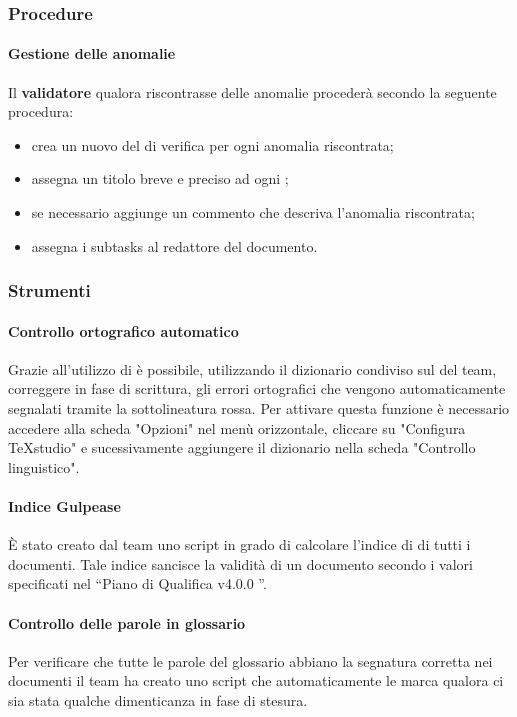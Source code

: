 \subsubsection{Procedure}
\label{sec:3.2.2}
	\paragraph{Gestione delle anomalie}
	\label{sec:3.2.2.1}
			Il \textbf{validatore} qualora riscontrasse delle anomalie procederà secondo la seguente procedura:
			\begin{itemize}
				\item crea un nuovo  del  di verifica per ogni anomalia riscontrata;
				\item assegna un titolo breve e preciso ad ogni ;
				\item se necessario aggiunge un commento che descriva l'anomalia riscontrata;
				\item assegna i subtasks al redattore del documento.
			\end{itemize}
\subsubsection{Strumenti}
\label{sec:3.2.3}
\paragraph{Controllo ortografico automatico}
Grazie all'utilizzo di  è possibile, utilizzando il dizionario condiviso sul  del team, correggere in fase di scrittura, gli errori ortografici che vengono automaticamente segnalati tramite la sottolineatura rossa. Per attivare questa funzione è necessario accedere alla scheda "Opzioni" nel menù orizzontale, cliccare su "Configura TeXstudio" e sucessivamente aggiungere il dizionario nella scheda "Controllo linguistico".

\paragraph{Indice Gulpease}
È stato creato dal team uno script in grado di calcolare l’indice di  di tutti i documenti.
Tale indice sancisce la validità di un documento secondo i valori specificati nel “Piano di Qualifica v4.0.0 ”.

\paragraph{Controllo delle parole in glossario}
Per verificare che tutte le parole del glossario abbiano la segnatura corretta nei documenti il team ha creato uno script che automaticamente le marca qualora ci sia stata qualche dimenticanza in fase di stesura.

